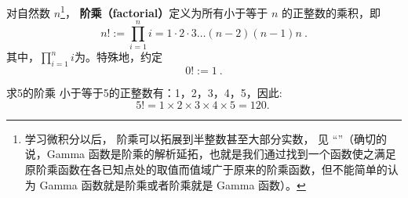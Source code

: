 
\begin{issues}
\issueDraft
\end{issues}


对自然数 $n$\footnote{学习微积分以后， 阶乘可以拓展到半整数甚至大部分实数， 见 “”（确切的说，Gamma 函数是阶乘的解析延拓，也就是我们通过找到一个函数使之满足原阶乘函数在各已知点处的取值而值域广于原来的阶乘函数，但不能简单的认为 Gamma 函数就是阶乘或者阶乘就是 Gamma 函数）。}， \textbf{阶乘（factorial）}定义为所有小于等于 $n$ 的正整数的乘积，即
\begin{equation}
n! := \prod_{i = 1}^n i =1 \cdot 2 \cdot 3 \dots (n - 2) (n - 1)n~.
\end{equation}
其中，$\prod_{i = 1}^n i$为。特殊地，约定
\begin{equation}
0! := 1~.
\end{equation}

\begin{example}{求5的阶乘}
小于等于5的正整数有：1，2，3，4，5，因此:
$$5! = 1\times 2\times 3\times 4\times 5 = 120.~$$
\end{example}





